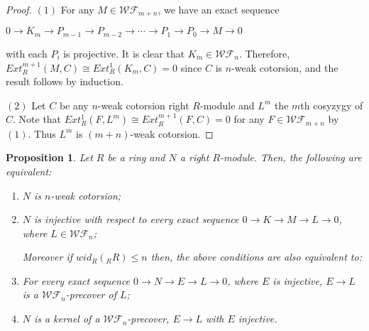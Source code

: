 ﻿\documentclass[
11pt,%
tightenlines,%
twoside,%
onecolumn,%
nofloats,%
nobibnotes,%
nofootinbib,%
superscriptaddress,%
noshowpacs,%
centertags]%
{revtex4}
\newtheorem{proposition}{Proposition}
\begin{document}
\begin{proof}
$(1)$ For any $M \in \mathcal{WF}_{m + n}$, we have an exact sequence
\begin{center}
$0 \rightarrow K_m \rightarrow P_{m-1} \rightarrow P_{m-2} \rightarrow \cdots \rightarrow P_1
 \rightarrow P_0 \rightarrow M \rightarrow 0$
\end{center}
with each $P_i$ is projective. It is clear that $K_m \in
\mathcal{WF}_n$. Therefore,  $Ext_R^{m+1}(M, C) \cong Ext_R^1(K_m,
C) = 0$ since $C$ is $n$-weak cotorsion, and the result follows by
induction.
\par $(2)$ Let $C$ be any $n$-weak cotorsion right $R$-module and $L^m$ the
 $m$th cosyzygy of $C$. Note that $Ext_R^1(F, L^m) \cong Ext_R^{m+1}(F, C) = 0$ for
  any $F \in \mathcal{WF}_{m + n}$ by $(1)$. Thus $L^m$ is $(m+n)$-weak cotorsion.
\end{proof}

\begin{proposition}\label{pn1}
Let $R$ be a ring and $N$ a right $R$-module. Then, the following are equivalent:
\begin{enumerate}
\item $N$ is $n$-weak cotorsion;
\item $N$ is injective with respect to every exact sequence
 $0 \rightarrow K \rightarrow M \rightarrow L \rightarrow 0$, where $L \in \mathcal{WF}_n$;
\begin{flushleft}
Moreover if $wid_R(_RR) \leq n$ then, the above conditions are also equivalent to:
\end{flushleft}
\item For every exact sequence $0 \rightarrow N \rightarrow E \rightarrow L \rightarrow 0$,
where $E$ is injective, $E \rightarrow L$ is a $\mathcal{WF}_n$-precover of $L$;
\item $N$ is a kernel of a $\mathcal{WF}_n$-precover, $E \rightarrow L$ with $E$ injective.
\end{enumerate}
\end{proposition}
\end{document}
